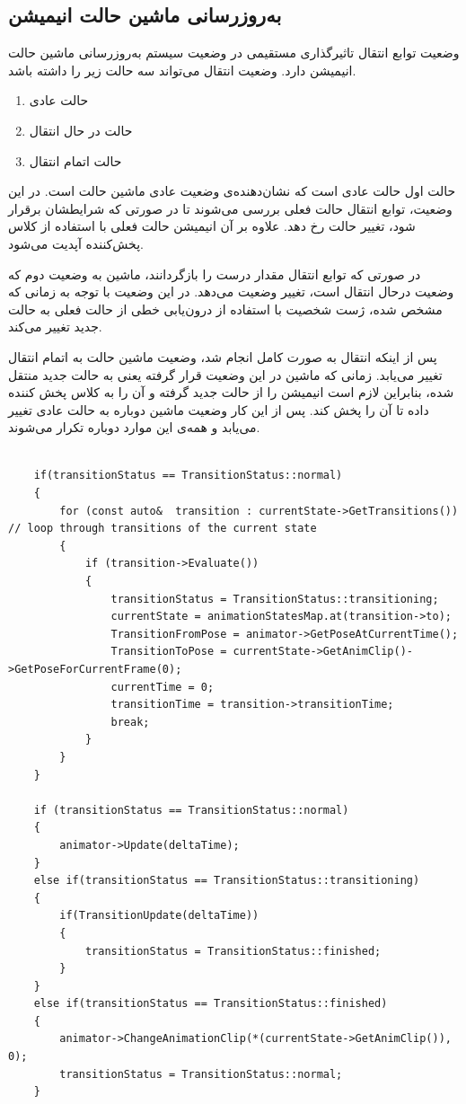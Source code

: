 \subsection{به‌روزرسانی ماشین حالت انیمیشن}

وضعیت توابع انتقال تاثیرگذاری مستقیمی در وضعیت سیستم به‌روزرسانی ماشین حالت انیمیشن دارد.
وضعیت انتقال می‌تواند سه حالت زیر را داشته باشد.

\begin{enumerate}
	\item حالت عادی 
	\item حالت در حال انتقال 
	\item حالت اتمام انتقال 
\end{enumerate}


حالت اول حالت عادی
است که نشان‌دهنده‌ی وضعیت عادی ماشین حالت است. در این وضعیت، توابع انتقال حالت فعلی بررسی می‌شوند تا در صورتی که شرایطشان برقرار شود، تغییر حالت رخ دهد. علاوه بر آن انیمیشن حالت فعلی با استفاده از کلاس پخش‌کننده آپدیت می‌شود.

در صورتی که توابع انتقال مقدار درست
را بازگردانند، ماشین به وضعیت دوم که وضعیت درحال انتقال
است، تغییر وضعیت می‌دهد.
در این وضعیت با توجه به زمانی که مشخص شده، ژست شخصیت با استفاده از درون‌یابی خطی از حالت فعلی به حالت جدید تغییر می‌کند.

پس از اینکه انتقال به صورت کامل انجام شد، وضعیت ماشین حالت به اتمام انتقال
تغییر می‌یابد. زمانی که ماشین‌ در این وضعیت قرار گرفته یعنی به حالت جدید منتقل شده، بنابراین لازم است انیمیشن را از حالت جدید گرفته و آن را به کلاس پخش کننده داده تا آن را پخش کند.
پس از این کار وضعیت ماشین دوباره به حالت عادی تغییر می‌یابد و همه‌ی این موارد دوباره تکرار می‌شوند.

\begin{latin}
	

\begin{lstlisting}

	if(transitionStatus == TransitionStatus::normal) 
	{
		for (const auto&  transition : currentState->GetTransitions()) // loop through transitions of the current state
		{
			if (transition->Evaluate())
			{
				transitionStatus = TransitionStatus::transitioning;
				currentState = animationStatesMap.at(transition->to);
				TransitionFromPose = animator->GetPoseAtCurrentTime();
				TransitionToPose = currentState->GetAnimClip()->GetPoseForCurrentFrame(0);
				currentTime = 0;
				transitionTime = transition->transitionTime;
				break;
			}
		}
	}

	if (transitionStatus == TransitionStatus::normal)
	{
		animator->Update(deltaTime);
	}
	else if(transitionStatus == TransitionStatus::transitioning)
	{
		if(TransitionUpdate(deltaTime)) 
		{
			transitionStatus = TransitionStatus::finished;
		}
	}
	else if(transitionStatus == TransitionStatus::finished)
	{
		animator->ChangeAnimationClip(*(currentState->GetAnimClip()), 0); 
		transitionStatus = TransitionStatus::normal;
	}
\end{lstlisting}

\end{latin}